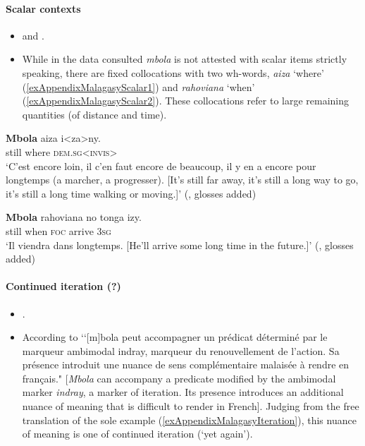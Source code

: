 \paragraph{Scalar contexts}\label{appendixMalagasyScalar}
\begin{itemize}
	\item \textcite[398–400]{Dez1980} and \textcite[153]{Malzac1960}.
	\item While in the data consulted \textit{mbola} is not attested with scalar items strictly speaking, there are fixed collocations with two wh-words, \textit{aiza} \lq where' (\ref{exAppendixMalagasyScalar1}) and \textit{rahoviana} \lq when' (\ref{exAppendixMalagasyScalar2}). These collocations refer to large remaining quantities (of distance and time).
\end{itemize}

\begin{exe}
	\ex\label{exAppendixMalagasyScalar1}
	\gll \textbf{Mbola} aiza i<za>ny.\\
	still where \textsc{dem}.\textsc{sg}<\textsc{invis}>\\
	\glt \lq C'est encore loin, il c'en faut encore de beaucoup, il y en a encore pour longtemps (a marcher, a progresser). [It’s still far away, it’s still a long way to go, it’s still a long time walking or moving.]' (\cite[398]{Dez1980}, glosses added)
	
	\ex\label{exAppendixMalagasyScalar2}
	\gll \textbf{Mbola} rahoviana no tonga izy.\\
	still when \textsc{foc} arrive 3\textsc{sg}\\
	\glt \lq Il viendra dans longtemps. [He'll arrive some long time in the future.]\rq{ } (\cite[400]{Dez1980}, glosses added)
\end{exe}

\paragraph{Continued iteration (?)}
\label{appendixMalagasyContinuedIteration}
\begin{itemize}
	\item \textcite[537]{Dez1980}.
	\item According to \textcite[537]{Dez1980} \lq\lq [m]bola peut accompagner un prédicat déterminé par le marqueur ambimodal indray, marqueur du renouvellement de  l'ac\-tion. Sa présence introduit une nuance de sens complémentaire malaisée à rendre en français." [\textit{Mbola} can accompany a predicate modified by the ambimodal marker \textit{indray}, a marker of iteration. Its presence introduces an additional nuance of meaning that is difficult to render in French]. Judging from the free translation of the sole example (\ref{exAppendixMalagasyIteration}), this nuance of meaning is one of continued iteration (\lq yet again').
\end{itemize}

